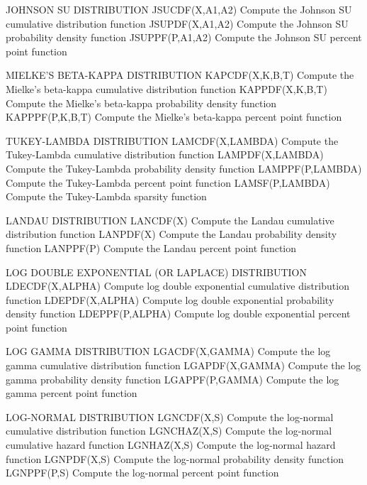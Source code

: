 JOHNSON SU DISTRIBUTION
   JSUCDF(X,A1,A2)    Compute the Johnson SU cumulative distribution
                      function
   JSUPDF(X,A1,A2)    Compute the Johnson SU probability density
                      function
   JSUPPF(P,A1,A2)    Compute the Johnson SU percent point function
 
MIELKE'S BETA-KAPPA DISTRIBUTION
   KAPCDF(X,K,B,T)    Compute the Mielke's beta-kappa cumulative
                      distribution function
   KAPPDF(X,K,B,T)    Compute the Mielke's beta-kappa probability
                      density function
   KAPPPF(P,K,B,T)    Compute the Mielke's beta-kappa percent point
                      function
 
TUKEY-LAMBDA DISTRIBUTION
   LAMCDF(X,LAMBDA)   Compute the Tukey-Lambda cumulative distribution
                      function
   LAMPDF(X,LAMBDA)   Compute the Tukey-Lambda probability density
                      function
   LAMPPF(P,LAMBDA)   Compute the Tukey-Lambda percent point function
   LAMSF(P,LAMBDA)    Compute the Tukey-Lambda sparsity function
 
LANDAU DISTRIBUTION
   LANCDF(X)          Compute the Landau cumulative distribution
                      function
   LANPDF(X)          Compute the Landau probability density function
   LANPPF(P)          Compute the Landau percent point function
 
LOG DOUBLE EXPONENTIAL (OR LAPLACE) DISTRIBUTION
   LDECDF(X,ALPHA)    Compute log double exponential cumulative
                      distribution function
   LDEPDF(X,ALPHA)    Compute log double exponential probability
                      density function
   LDEPPF(P,ALPHA)    Compute log double exponential percent point
                      function
 
LOG GAMMA DISTRIBUTION
   LGACDF(X,GAMMA)    Compute the log gamma cumulative distribution
                      function
   LGAPDF(X,GAMMA)    Compute the log gamma probability density
                      function
   LGAPPF(P,GAMMA)    Compute the log gamma percent point function
 
LOG-NORMAL DISTRIBUTION
   LGNCDF(X,S)        Compute the log-normal cumulative distribution
                      function
   LGNCHAZ(X,S)       Compute the log-normal cumulative hazard
                      function
   LGNHAZ(X,S)        Compute the log-normal hazard function
   LGNPDF(X,S)        Compute the log-normal probability density
                      function
   LGNPPF(P,S)        Compute the log-normal percent point function
 
